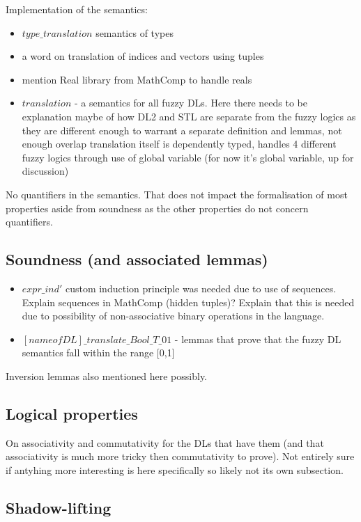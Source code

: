 \documentclass[a4paper,UKenglish,cleveref, autoref, thm-restate]{lipics-v2021}
\begin{document}
Implementation of the semantics: 
\begin{itemize}
	\item $type\_translation$ semantics of types
	\item a word on translation of indices and vectors using tuples
	\item mention Real library from MathComp to handle reals
	\item $translation$ - a semantics for all fuzzy DLs. Here there needs to be explanation maybe of how DL2 and STL are separate from the fuzzy logics as they are different enough to warrant a separate definition and lemmas, not enough overlap
	translation itself is dependently typed, handles 4 different fuzzy logics through use of global variable (for now it's global variable, up for discussion)
	
\end{itemize}

No quantifiers in the semantics. That does not impact the formalisation of most properties aside from soundness as the other properties do not concern quantifiers.

\subsection{Soundness (and associated lemmas)}

\begin{itemize}
	\item $expr\_ind'$ custom induction principle was needed due to use of sequences. Explain sequences in MathComp (hidden tuples)? Explain that this is needed due to possibility of non-associative binary operations in the language.
	\item $[name of DL]\_translate\_Bool\_T\_01$ - lemmas that prove that the fuzzy DL semantics fall within the range [0,1]
\end{itemize}

Inversion lemmas also mentioned here possibly.

\subsection{Logical properties}

On associativity and commutativity for the DLs that have them (and that associativity is much more tricky then commutativity to prove). Not entirely sure if antyhing more interesting is here specifically so likely not its own subsection.

\subsection{Shadow-lifting}
\end{document}
